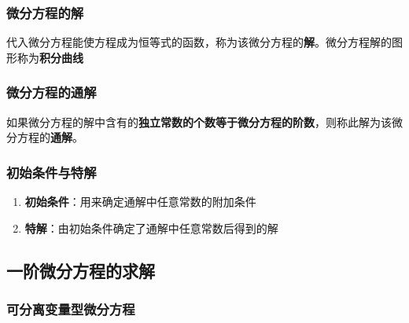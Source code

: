 \documentclass[../book.tex]{subfiles}
\begin{document}
    \subsubsection{微分方程的解}

    代入微分方程能使方程成为恒等式的函数，称为该微分方程的\textbf{解}。微分方程解的图形称为\textbf{积分曲线}

    \subsubsection{微分方程的通解}

    如果微分方程的解中含有的\textbf{独立常数的个数等于微分方程的阶数}，则称此解为该微分方程的\textbf{通解}。

    \subsubsection{初始条件与特解}

    \begin{enumerate}
        \item \textbf{初始条件}：用来确定通解中任意常数的附加条件
        \item \textbf{特解}：由初始条件确定了通解中任意常数后得到的解
    \end{enumerate}

    \subsection{一阶微分方程的求解}

    \subsubsection{可分离变量型微分方程}
\end{document}
